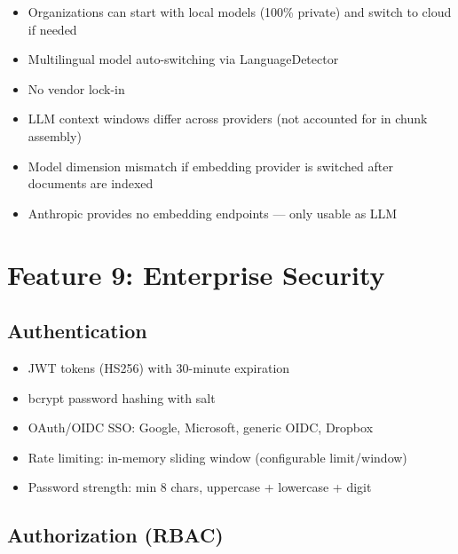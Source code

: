 \documentclass[12pt, a4paper, oneside]{report}
\begin{document}
\begin{probox}[Benefits]
\begin{itemize}
  \item Organizations can start with local models (100\% private) and switch to cloud if needed
  \item Multilingual model auto-switching via LanguageDetector
  \item No vendor lock-in
\end{itemize}
\end{probox}

\begin{conbox}[Drawbacks]
\begin{itemize}
  \item LLM context windows differ across providers (not accounted for in chunk assembly)
  \item Model dimension mismatch if embedding provider is switched after documents are indexed
  \item Anthropic provides no embedding endpoints — only usable as LLM
\end{itemize}
\end{conbox}

\section{Feature 9: Enterprise Security}

\subsection*{Authentication}
\begin{itemize}
  \item JWT tokens (HS256) with 30-minute expiration
  \item bcrypt password hashing with salt
  \item OAuth/OIDC SSO: Google, Microsoft, generic OIDC, Dropbox
  \item Rate limiting: in-memory sliding window (configurable limit/window)
  \item Password strength: min 8 chars, uppercase + lowercase + digit
\end{itemize}

\subsection*{Authorization (RBAC)}
\end{document}
